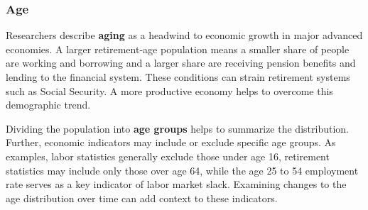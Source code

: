 \subsubsection*{Age}
\begin{minipage}{0.76\textwidth} 
\small Researchers describe \textbf{aging} as a headwind to economic growth in major advanced economies. A larger retirement-age population means a smaller share of people are working and borrowing and a larger share are receiving pension benefits and lending to the financial system. These conditions can strain retirement systems such as Social Security. A more productive economy helps to overcome this demographic trend.
\end{minipage}

\begin{minipage}{0.28\textwidth}
\small 
\end{minipage}\hspace{5mm}
\begin{minipage}{0.44\textwidth}
\vspace{4.4cm}

\hspace{5mm} 

\end{minipage}
\vspace{3mm}

\begin{minipage}{0.76\textwidth}
\small Dividing the population into \textbf{age groups} helps to summarize the distribution. Further, economic indicators may include or exclude specific age groups. As examples, labor statistics generally exclude those under age 16, retirement statistics may include only those over age 64, while the age 25 to 54 employment rate serves as a key indicator of labor market slack. Examining changes to the age distribution over time can add context to these indicators.
\end{minipage}
\vspace{0.5mm}

